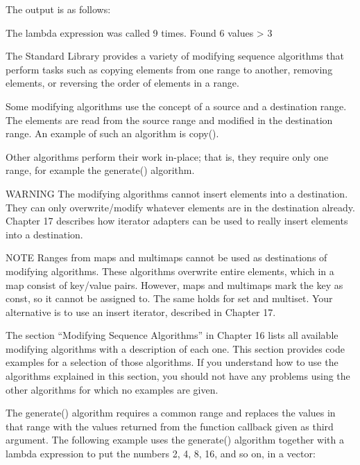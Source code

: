 The output is as follows:

\begin{shell}
The lambda expression was called 9 times.
Found 6 values > 3
\end{shell}


The Standard Library provides a variety of modifying sequence algorithms that perform tasks such as copying elements from one range to another, removing elements, or reversing the order of elements in a range.

Some modifying algorithms use the concept of a source and a destination range. The elements are read from the source range and modified in the destination range. An example of such an algorithm is copy().

Other algorithms perform their work in-place; that is, they require only one range, for example the generate() algorithm.

\begin{myWarning}{WARNING}
The modifying algorithms cannot insert elements into a destination. They can only overwrite/modify whatever elements are in the destination already. Chapter 17 describes how iterator adapters can be used to really insert elements into a destination.
\end{myWarning}

\begin{myNotic}{NOTE}
Ranges from maps and multimaps cannot be used as destinations of modifying algorithms. These algorithms overwrite entire elements, which in a map consist of key/value pairs. However, maps and multimaps mark the key as const, so it cannot be assigned to. The same holds for set and multiset. Your alternative is to use an insert iterator, described in Chapter 17.
\end{myNotic}

The section “Modifying Sequence Algorithms” in Chapter 16 lists all available modifying algorithms with a description of each one. This section provides code examples for a selection of those algorithms. If you understand how to use the algorithms explained in this section, you should not have any problems using the other algorithms for which no examples are given.


The generate() algorithm requires a common range and replaces the values in that range with the values returned from the function callback given as third argument. The following example uses the generate() algorithm together with a lambda expression to put the numbers 2, 4, 8, 16, and so on, in a vector:

